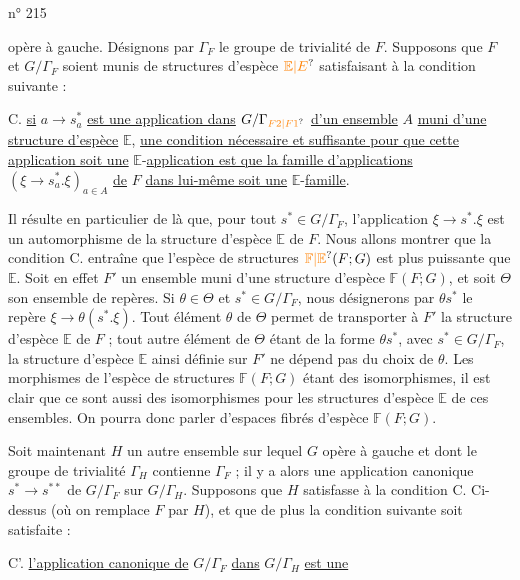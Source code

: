 
n° 215

opère à gauche. Désignons par $\Gamma_F$ le groupe de trivialité de $F$. Supposons que $F$ et $G/\Gamma_F$ soient munis de structures d'espèce $\unsure{\mathbb E|E}$ satisfaisant à la condition suivante :

C. \uline{si} $a\rightarrow s_a^*$ \uline{est une application dans} $G/\Gamma_{\handwritten{\unsure{F2|F1}}}$ \uline{d'un ensemble} $A$ \uline{muni d'une structure d'espèce} $\mathbb E$, \uline{une condition nécessaire et suffisante pour que cette application soit une} $\mathbb E$-\uline{application est que la famille d'applications} $(\xi\rightarrow s_a^*.\xi)_{a\in A}$ \uline{de} $F$ \uline{dans lui-même soit une} $\mathbb E$-\uline{famille}.

Il résulte en particulier de là que, pour tout $s^*\in G/\Gamma_F$, l'application $\xi\rightarrow s^*.\xi$ est un automorphisme de la structure d'espèce $\mathbb E$ de $F$. Nous allons montrer que la condition C. entraîne que l'espèce de structures $\unsure{\mathbb F|\mathbb E}(F;G)$ est plus puissante que $\mathbb E$. Soit en effet $F'$ un ensemble muni d'une structure d'espèce $\mathbb F(F;G)$, et soit $\Theta$ son ensemble de repères. Si $\theta\in\Theta$ et $s^*\in G/\Gamma_F$, nous désignerons par $\theta s^*$ le repère $\xi\rightarrow\theta(s^*.\xi)$. Tout élément $\theta$ de $\Theta$ permet de transporter à $F'$ la structure d'espèce $\mathbb E$ de $F$ ; tout autre élément de $\Theta$ étant de la forme $\theta s^*$, avec  $s^*\in G/\Gamma_F$, la structure d'espèce $\mathbb E$ ainsi définie sur $F'$ ne dépend pas du choix de $\theta$. Les morphismes de l'espèce de structures $\mathbb F(F;G)$ étant des isomorphismes, il est clair que ce sont aussi des isomorphismes pour les structures d'espèce $\mathbb E$ de ces ensembles. On pourra donc parler d'espaces fibrés d'espèce $\mathbb F(F;G)$.

Soit maintenant $H$ un autre ensemble sur lequel $G$ opère à gauche et dont le groupe de trivialité $\Gamma_H$ contienne $\Gamma_F$ ; il y a alors une application canonique $s^*\rightarrow s^{**}$ de $G/\Gamma_F$ sur $G/\Gamma_H$. Supposons que $H$ satisfasse à la condition C. Ci-dessus (où on remplace $F$ par $H$), et que de plus la condition suivante soit satisfaite :

C'. \uline{l'application canonique de} $G/\Gamma_F$ \uline{dans} $G/\Gamma_H$ \uline{est une}

